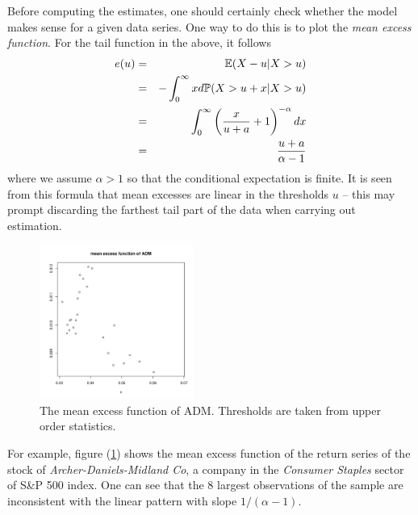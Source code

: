\documentclass{article}
\newcommand{\E}{
  \mathbb{E}
}
\renewcommand{\P}{
  \mathbb{P}
}
\newcommand{\1}[1]{
  \mathbf{1}_{\{#1\}}
}
\begin{document}
Before computing the estimates, one should certainly check whether the
model makes sense for a given data series. One way to do this is to
plot the {\it mean excess function}. For the tail function in the
above, it follows
\begin{eqnarray}
  e(u) &=& \E (X - u | X > u) \nonumber \\
  &=& -\int_0^\infty x  d\P(X > u + x | X > u) \nonumber \\
  &=& \int_0^\infty \left(
  {x \over u + a} + 1
  \right)^{-\alpha} dx \nonumber \\
  &=& {u + a \over \alpha - 1} \label{eq:MEF}
\end{eqnarray}
where we assume $\alpha > 1$ so that the conditional expectation is
finite. It is seen from this formula that mean excesses are linear in
the thresholds $u$ -- this may prompt discarding the farthest tail
part of the data when carrying out estimation.
\begin{figure}
  \centering
  \includegraphics[width=0.45\textwidth]{ADM_MEF.pdf}
  \caption{\scriptsize The mean excess function of ADM. Thresholds are
    taken from upper order statistics.}
  \label{fig:ADM_MEF}
\end{figure}

For example, figure (\ref{fig:ADM_MEF}) shows the mean
excess function of the return series of the stock of {\it
  Archer-Daniels-Midland Co}, a company in the {\it Consumer Staples}
sector of S\&P 500 index.
One can see that the 8 largest observations of the sample are
inconsistent with the linear pattern with slope $1/(\alpha - 1)$.
\end{document}

